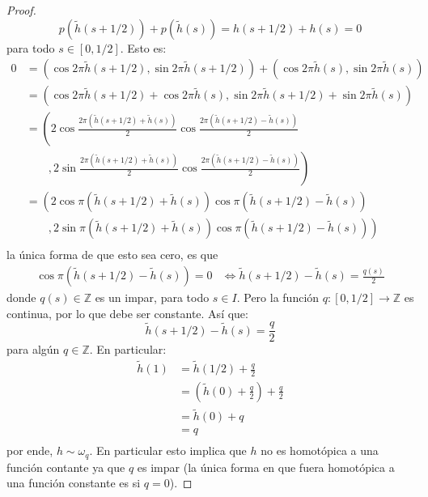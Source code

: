\documentclass{article}
\newcounter{it}
\theoremstyle{largebreak}
\newcommand\cf[3]{\ensuremath{#1:#2\rightarrow#3}}
\begin{document}
\begin{proof}
        \begin{equation*}
            p(\widetilde{h}(s+1/2))+p(\widetilde{h}(s))=h(s+1/2)+h(s)=0
        \end{equation*}
        para todo $s\in[0,1/2]$. Esto es:
        \begin{equation*}
            \begin{split}
                0&=(\cos 2\pi \widetilde{h}(s+1/2),\sin 2\pi \widetilde{h}(s+1/2))+(\cos 2\pi \widetilde{h}(s),\sin 2\pi \widetilde{h}(s))\\
                &=(\cos 2\pi \widetilde{h}(s+1/2)+\cos 2\pi \widetilde{h}(s),\sin 2\pi \widetilde{h}(s+1/2)+\sin 2\pi \widetilde{h}(s))\\
                &=\left(2\cos\frac{2\pi(\widetilde{h}(s+1/2)+\widetilde{h}(s))}{2}\cos\frac{2\pi(\widetilde{h}(s+1/2)-\widetilde{h}(s))}{2}\right.\\
                &\quad\quad,\left.2\sin\frac{2\pi(\widetilde{h}(s+1/2)+\widetilde{h}(s))}{2}\cos\frac{2\pi(\widetilde{h}(s+1/2)-\widetilde{h}(s))}{2}\right)\\
                &=\left(2\cos\pi(\widetilde{h}(s+1/2)+\widetilde{h}(s))\cos\pi(\widetilde{h}(s+1/2)-\widetilde{h}(s))\right.\\
                &\quad\quad,\left.2\sin\pi(\widetilde{h}(s+1/2)+\widetilde{h}(s))\cos\pi(\widetilde{h}(s+1/2)-\widetilde{h}(s))\right)\\
            \end{split}
        \end{equation*}
        la única forma de que esto sea cero, es que
        \begin{equation*}
            \begin{split}
                \cos\pi(\widetilde{h}(s+1/2)-\widetilde{h}(s))=0&\iff \widetilde{h}(s+1/2)-\widetilde{h}(s)=\frac{q(s)}{2}
            \end{split}
        \end{equation*}
        donde $q(s)\in\mathbb{Z}$ es un impar, para todo $s\in I$. Pero la función $\cf{q}{[0,1/2]}{\mathbb{Z}}$ es continua, por lo que debe ser constante. Así que:
        \begin{equation*}
            \widetilde{h}(s+1/2)-\widetilde{h}(s)=\frac{q}{2}
        \end{equation*}
        para algún $q\in\mathbb{Z}$. En particular:
        \begin{equation*}
            \begin{split}
                \widetilde{h}(1)&=\widetilde{h}(1/2)+\frac{q}{2}\\
                &=\left(\widetilde{h}(0)+\frac{q}{2}\right)+\frac{q}{2}\\
                &=\widetilde{h}(0)+q\\
                &=q\\
            \end{split}
        \end{equation*}
        por ende, $h\sim\omega_q$. En particular esto implica que $h$ no es homotópica a una función contante ya que $q$ es impar (la única forma en que fuera homotópica a una función constante es si $q=0$).


\end{proof}
\end{document}
